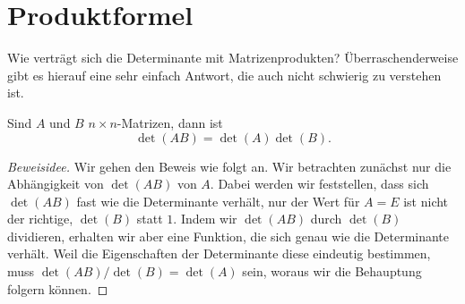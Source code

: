\section{Produktformel}
Wie verträgt sich die Determinante mit Matrizenprodukten?
Überraschenderweise gibt es hierauf eine sehr einfach Antwort,
die auch nicht schwierig zu verstehen ist.

\begin{satz}\label{detprodukt}
Sind $A$ und $B$ $n\times n$-Matrizen, dann ist
\[
\det(AB)=\det(A)\det(B).
\]
\end{satz}

\begin{proof}[Beweisidee]
Wir gehen den Beweis wie folgt an.
Wir betrachten zunächst nur die Abhängigkeit von $\det(AB)$ von $A$.
Dabei werden wir feststellen,
dass sich $\det(AB)$ fast wie die Determinante verhält, nur der
Wert für $A=E$ ist nicht der richtige, $\det(B)$ statt $1$.
Indem wir
$\det(AB)$ durch $\det(B)$ dividieren, erhalten wir aber eine Funktion,
die sich genau wie die Determinante verhält.
Weil die Eigenschaften der Determinante diese eindeutig bestimmen, muss
$\det(AB)/\det(B)=\det(A)$ sein, woraus wir die Behauptung folgern können.
\end{proof}

